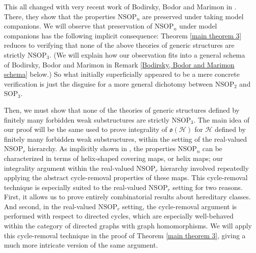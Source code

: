 \documentclass{amsart}
\theoremstyle{definition}
\theoremstyle{remark}
\numberwithin{equation}{section}
\begin{document}
This all changed with very recent work of Bodirsky, Bodor and Marimon in \cite{BBM25}. There, they show that the properties $\mathrm{NSOP}_{n}$ are preserved under taking model companions. We will observe that preservation of $\mathrm{NSOP}_{n}$ under model companions has the following implicit consequence: Theorem \ref{main theorem 3} reduces to verifying that none of the above theories of generic structures are strictly $\mathrm{NSOP}_{3}$. (We will explain how our observation fits into a general schema of Bodirsky, Bodor and Marimon in Remark \ref{Bodirsky, Bodor and Marimon schema} below.) So what initially superficially appeared to be a mere concrete verification is just the disguise for a more general dichotomy between $\mathrm{NSOP}_{2}$ and $\mathrm{SOP}_{3}$.

Then, we must show that none of the theories of generic structures defined by finitely many forbidden weak substructures are strictly $\mathrm{NSOP}_{3}$. The main idea of our proof will be the same used to prove integrality of $\mathfrak{o}(\mathcal{H})$ for $\mathcal{H}$ defined by finitely many forbidden weak substructures, within the setting of the real-valued $\mathrm{NSOP}_{r}$ hierarchy. As implicitly shown in \cite{Mal10b}, the properties $\mathrm{NSOP}_{n}$ can be characterized in terms of helix-shaped covering maps, or helix maps; our integrality argument within the real-valued $\mathrm{NSOP}_{r}$ hierarchy involved repeatedly applying the abstract cycle-removal properties of these maps. This cycle-removal technique is especially suited to the real-valued $\mathrm{NSOP}_{r}$ setting for two reasons. First, it allows us to prove entirely combinatorial results about hereditary classes. And second, in the real-valued $\mathrm{NSOP}_{r}$ setting, the cycle-removal argument is performed with respect to directed cycles, which are especially well-behaved within the category of directed graphs with graph homomorphisms. We will apply this cycle-removal technique in the proof of Theorem \ref{main theorem 3}, giving a much more intricate version of the same argument.

\:
\end{document}
